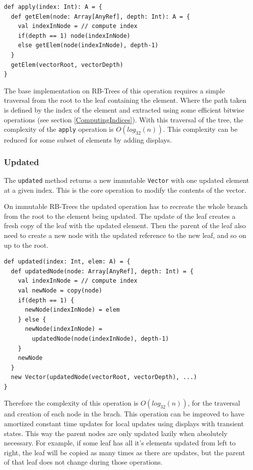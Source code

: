 \begin{lstlisting}[frame=single]
def apply(index: Int): A = {
  def getElem(node: Array[AnyRef], depth: Int): A = {
    val indexInNode = // compute index
    if(depth == 1) node(indexInNode)
    else getElem(node(indexInNode), depth-1) 
  }
  getElem(vectorRoot, vectorDepth)
}
\end{lstlisting}

The base implementation on RB-Trees of this operation requires a simple traversal from the root to the leaf containing the element. Where the path taken is defined by the index of the element and extracted using some efficient bitwise operations (see section \ref{ComputingIndices}). With this traversal of the tree, the complexity of the \texttt{apply} operation is $O(log_{32}(n))$. This complexity can be reduced for some subset of elements by adding displays.



\subsubsection{Updated}
\label{sec:updated}
The \texttt{updated} method returns a new immutable \texttt{Vector} with one updated element at a given index. This is the core operation to modify the contents of the vector. 

On immutable RB-Trees the updated operation has to recreate the whole branch from the root to the element being updated. The update of the leaf creates a fresh copy of the leaf with the updated element. Then the parent of the leaf also need to create a new node with the updated reference to the new leaf, and so on up to the root. 

\begin{lstlisting}[frame=single]
def updated(index: Int, elem: A) = {
  def updatedNode(node: Array[AnyRef], depth: Int) = {
    val indexInNode = // compute index
    val newNode = copy(node)
    if(depth == 1) {
      newNode(indexInNode) = elem
    } else {
      newNode(indexInNode) = 
        updatedNode(node(indexInNode), depth-1)
    }
    newNode
  }
  new Vector(updatedNode(vectorRoot, vectorDepth), ...)
}
\end{lstlisting}

Therefore the complexity of this operation is $O(log_{32}(n))$, for the traversal and creation of each node in the brach. This operation can be improved to have amortized constant time updates for local updates using displays with transient states. This way the parent nodes are only updated lazily when absolutely necessary. For example, if some leaf has all it's elements updated from left to right, the leaf will be copied as many times as there are updates, but the parent of that leaf does not change during those operations.

